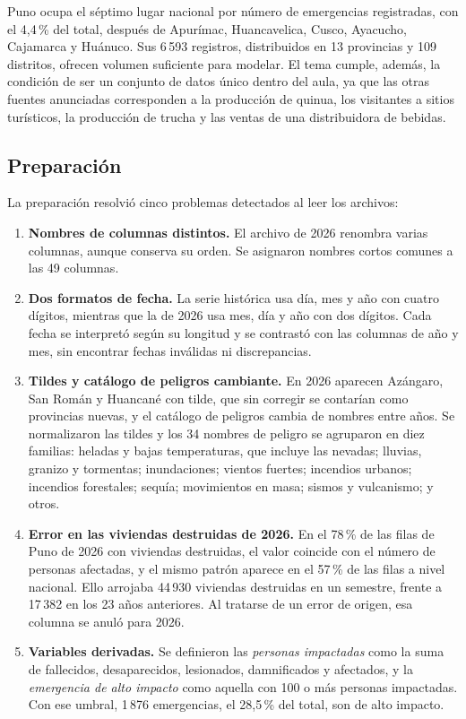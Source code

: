 \documentclass[12pt,a4paper]{article}
\begin{document}
Puno ocupa el séptimo lugar nacional por número de emergencias registradas, con el 4,4\,\% del total, después de
Apurímac, Huancavelica, Cusco, Ayacucho, Cajamarca y Huánuco. Sus 6\,593 registros, distribuidos en 13 provincias y
109 distritos, ofrecen volumen suficiente para modelar. El tema cumple, además, la condición de ser un conjunto de
datos único dentro del aula, ya que las otras fuentes anunciadas corresponden a la producción de quinua, los
visitantes a sitios turísticos, la producción de trucha y las ventas de una distribuidora de bebidas.

\subsection{Preparación}

La preparación resolvió cinco problemas detectados al leer los archivos:

\begin{enumerate}
\item \textbf{Nombres de columnas distintos.} El archivo de 2026 renombra varias columnas, aunque conserva su orden.
Se asignaron nombres cortos comunes a las 49 columnas.
\item \textbf{Dos formatos de fecha.} La serie histórica usa día, mes y año con cuatro dígitos, mientras que la de 2026
usa mes, día y año con dos dígitos. Cada fecha se interpretó según su longitud y se contrastó con las columnas de
año y mes, sin encontrar fechas inválidas ni discrepancias.
\item \textbf{Tildes y catálogo de peligros cambiante.} En 2026 aparecen Azángaro, San Román y Huancané con tilde, que
sin corregir se contarían como provincias nuevas, y el catálogo de peligros cambia de nombres entre años. Se
normalizaron las tildes y los 34 nombres de peligro se agruparon en diez familias: heladas y bajas temperaturas,
que incluye las nevadas; lluvias, granizo y tormentas; inundaciones; vientos fuertes; incendios urbanos; incendios
forestales; sequía; movimientos en masa; sismos y vulcanismo; y otros.
\item \textbf{Error en las viviendas destruidas de 2026.} En el 78\,\% de las filas de Puno de 2026 con viviendas
destruidas, el valor coincide con el número de personas afectadas, y el mismo patrón aparece en el 57\,\% de las
filas a nivel nacional. Ello arrojaba 44\,930 viviendas destruidas en un semestre, frente a 17\,382 en los 23 años
anteriores. Al tratarse de un error de origen, esa columna se anuló para 2026.
\item \textbf{Variables derivadas.} Se definieron las \emph{personas impactadas} como la suma de fallecidos,
desaparecidos, lesionados, damnificados y afectados, y la \emph{emergencia de alto impacto} como aquella con 100 o
más personas impactadas. Con ese umbral, 1\,876 emergencias, el 28,5\,\% del total, son de alto impacto.
\end{enumerate}
\end{document}
